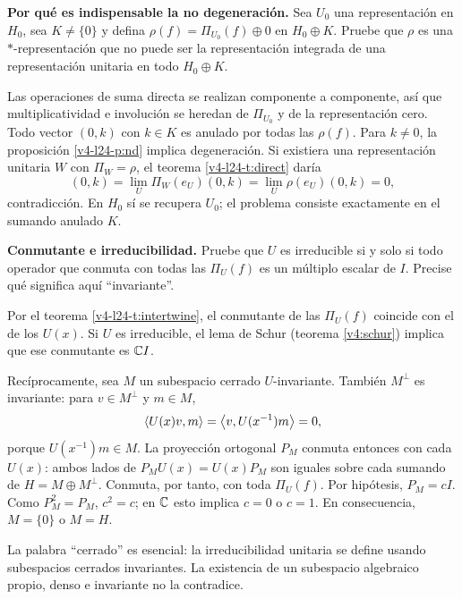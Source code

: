 \begin{ejercicio}\label{ej:v4-l24-6}
\textbf{Por qué es indispensable la no degeneración.}
Sea $U_0$ una representación en $H_0$, sea $K\ne\{0\}$ y defina $\rho(f)=\Pi_{U_0}(f)\oplus0$ en $H_0\oplus K$. Pruebe que $\rho$ es una $*$-representación que no puede ser la representación integrada de una representación unitaria en todo $H_0\oplus K$.

\end{ejercicio}
\begin{solucion} Las operaciones de suma directa se realizan componente a componente, así que multiplicatividad e involución se heredan de $\Pi_{U_0}$ y de la representación cero. Todo vector $(0,k)$ con $k\in K$ es anulado por todas las $\rho(f)$. Para $k\ne0$, la proposición \ref{v4-l24-p:nd} implica degeneración. Si existiera una representación unitaria $W$ con $\Pi_W=\rho$, el teorema \ref{v4-l24-t:direct} daría
\[
(0,k)=\lim_U\Pi_W(e_U)(0,k)=\lim_U\rho(e_U)(0,k)=0,
\]
contradicción. En $H_0$ sí se recupera $U_0$; el problema consiste exactamente en el sumando anulado $K$.\end{solucion}

\begin{ejercicio}\label{ej:v4-l24-7}
\textbf{Conmutante e irreducibilidad.}
Pruebe que $U$ es irreducible si y solo si todo operador que conmuta con todas las $\Pi_U(f)$ es un múltiplo escalar de $I$. Precise qué significa aquí ``invariante''.

\end{ejercicio}
\begin{solucion} Por el teorema \ref{v4-l24-t:intertwine}, el conmutante de las $\Pi_U(f)$ coincide con el de los $U(x)$. Si $U$ es irreducible, el lema de Schur (teorema \ref{v4:schur}) implica que ese conmutante es $\mathbb C I$.

Recíprocamente, sea $M$ un subespacio cerrado $U$-invariante. También $M^\perp$ es invariante: para $v\in M^\perp$ y $m\in M$,
\[
\left\langle U(x)v,m\right\rangle=\left\langle v,U(x^{-1})m\right\rangle=0,
\]
porque $U(x^{-1})m\in M$. La proyección ortogonal $P_M$ conmuta entonces con cada $U(x)$: ambos lados de $P_MU(x)=U(x)P_M$ son iguales sobre cada sumando de $H=M\oplus M^\perp$. Conmuta, por tanto, con toda $\Pi_U(f)$. Por hipótesis, $P_M=cI$. Como $P_M^2=P_M$, $c^2=c$; en $\mathbb C$ esto implica $c=0$ o $c=1$. En consecuencia, $M=\{0\}$ o $M=H$.

La palabra ``cerrado'' es esencial: la irreducibilidad unitaria se define usando subespacios cerrados invariantes. La existencia de un subespacio algebraico propio, denso e invariante no la contradice.\end{solucion}

